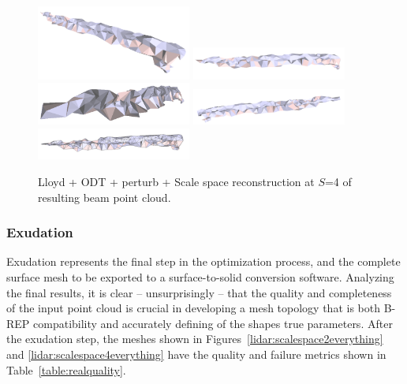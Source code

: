 \documentclass[12pt]{drexelthesis}
\let\Oldsubsubsection\subsubsection
\renewcommand{\subsubsection}{\FloatBarrier\Oldsubsubsection}
\begin{document}
\begin{figure}[!ht]
	\centering
		\includegraphics[width=2in]{real-lab-scans/meshed/optimized/scalespace4lloydodtperturb00.png}
		\includegraphics[width=2in]{real-lab-scans/meshed/optimized/scalespace4lloydodtperturb01.png}
		\includegraphics[width=2in]{real-lab-scans/meshed/optimized/scalespace4lloydodtperturb02.png}
		\includegraphics[width=2in]{real-lab-scans/meshed/optimized/scalespace4lloydodtperturb03.png}
		\includegraphics[width=2in]{real-lab-scans/meshed/optimized/scalespace4lloydodtperturb04.png}
		\caption[Lloyd + ODT + perturb + Scale space reconstruction at $S$=4 of segmented LiDAR data]{\centering Lloyd + ODT + perturb + Scale space reconstruction at $S$=4 of resulting beam point cloud.}
	\label{lidar:scalespace4lloydodtperturb}
\end{figure}

\subsubsection{Exudation}

Exudation represents the final step in the optimization process, and the complete surface mesh to be exported to a surface-to-solid conversion software. Analyzing the final results, it is clear -- unsurprisingly -- that the quality and completeness of the input point cloud is crucial in developing a mesh topology that is both B-REP compatibility and accurately defining of the shapes true parameters. After the exudation step, the meshes shown in Figures~\ref{lidar:scalespace2everything} and \ref{lidar:scalespace4everything} have the quality and failure metrics shown in Table~\ref{table:realquality}.
\end{document}
